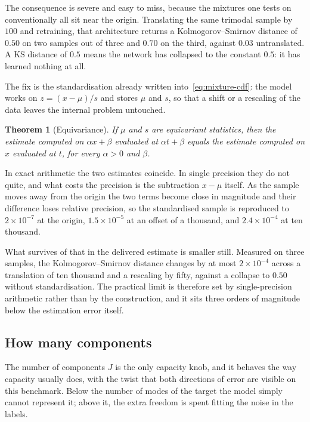 \documentclass[11pt]{article}
\newtheorem{theorem}{Theorem}
\begin{document}
The consequence is severe and easy to miss, because the mixtures one tests on conventionally
all sit near the origin. Translating the same trimodal sample by $100$ and retraining, that
architecture returns a Kolmogorov--Smirnov distance of $0.50$ on two samples out of three and
$0.70$ on the third, against $0.03$ untranslated. A KS distance of
$0.5$ means the network has collapsed to the constant $0.5$: it has learned nothing at all.

The fix is the standardisation already written into~\eqref{eq:mixture-cdf}: the model works
on $z = (x - \mu)/s$ and stores $\mu$ and $s$, so that a shift or a rescaling of the data
leaves the internal problem untouched.

\begin{theorem}[Equivariance]
\label{thm:equivariance}
If $\mu$ and $s$ are equivariant statistics, then the estimate computed on $\alpha x + \beta$
evaluated at $\alpha t + \beta$ equals the estimate computed on $x$ evaluated at $t$, for
every $\alpha > 0$ and $\beta$.
\end{theorem}

In exact arithmetic the two estimates coincide. In single precision they do not quite, and
what costs the precision is the subtraction $x - \mu$ itself. As the sample moves away from the origin the two terms become
close in magnitude and their difference loses relative precision, so the standardised sample
is reproduced to $2 \times 10^{-7}$ at the origin, $1.5 \times 10^{-5}$ at an offset of a
thousand, and $2.4 \times 10^{-4}$ at ten thousand.

What survives of that in the delivered estimate is smaller still. Measured on three samples,
the Kolmogorov--Smirnov distance changes by at most $2 \times 10^{-4}$ across a translation of
ten thousand and a rescaling by fifty, against a collapse to $0.50$ without standardisation.
The practical limit is therefore set by single-precision arithmetic rather than by the
construction, and it sits three orders of magnitude below the estimation error itself.

\subsection{How many components}
\label{sec:components}

The number of components $J$ is the only capacity knob, and it behaves the way capacity
usually does, with the twist that both directions of error are visible on this benchmark.
Below the number of modes of the target the model simply cannot represent it; above it, the
extra freedom is spent fitting the noise in the labels.
\end{document}
